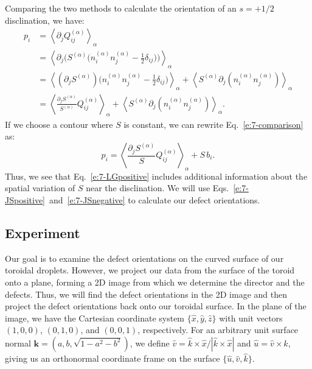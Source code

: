 Comparing the two methods to calculate the orientation of an $s = +1/2$ disclination, we have:
\begin{align}
 p_i &= \left \langle \partial_j Q_{ij}^{(\alpha)} \right \rangle_{\alpha} \nonumber \\
  &= \left \langle \partial_j \bigg(S^{(\alpha)}\bigg(n_{i}^{(\alpha)}n_{j}^{(\alpha)} - \frac{1}{2}\delta_{ij}\bigg)\bigg) \right \rangle_{\alpha} \nonumber \\
  &= \left \langle (\partial_j S^{(\alpha)}) \bigg(n_{i}^{(\alpha)}n_{j}^{(\alpha)} - \frac{1}{2}\delta_{ij}\bigg) \right \rangle_{\alpha}
      + \left \langle S^{(\alpha)} \partial_j (n_{i}^{(\alpha)}n_{j}^{(\alpha)}) \right \rangle_{\alpha} \nonumber \\
  &= \left \langle \frac{\partial_j S^{(\alpha)}}{S^{(\alpha)}} Q_{ij}^{(\alpha)}\right \rangle_{\alpha}
      + \left \langle S^{(\alpha)} \partial_j (n_{i}^{(\alpha)}n_{j}^{(\alpha)}) \right \rangle_{\alpha}\label{e:7-comparison}.
\end{align}
If we choose a contour where $S$ is constant, we can rewrite Eq.~\ref{e:7-comparison} as:
\begin{equation}
  p_i = \left \langle \frac{\partial_j S^{(\alpha)}}{S} Q_{ij}^{(\alpha)}\right \rangle_{\alpha}
      +  S \, b_i.
\end{equation}
Thus, we see that Eq.~\ref{e:7-LGpositive} includes additional information about the spatial variation of $S$ near the disclination.
We will use Eqs.~\ref{e:7-JSpositive}~and~\ref{e:7-JSnegative} to calculate our defect orientations.


\subsection{Experiment}
Our goal is to examine the defect orientations on the curved surface of our toroidal droplets.
However, we project our data from the surface of the toroid onto a plane, forming a 2D image from which we determine the director and the defects.
Thus, we will find the defect orientations in the 2D image and then project the defect orientations back onto our toroidal surface.
In the plane of the image, we have the Cartesian coordinate system $\{ \hat{x},\hat{y},\hat{z} \}$ with unit vectors $(1,0,0)$, $(0,1,0)$, and $(0,0,1)$, respectively.
For an arbitrary unit surface normal $\mathbf{k} = (a, b, \sqrt{1-a^2-b^2})$, we define $\hat{v} = \hat{k} \times \hat{x}/|\hat{k} \times \hat{x}|$ and $\hat{u} = \hat{v} \times \hat{k}$, giving us an orthonormal coordinate frame on the surface $\{\hat{u},\hat{v},\hat{k} \}$.

